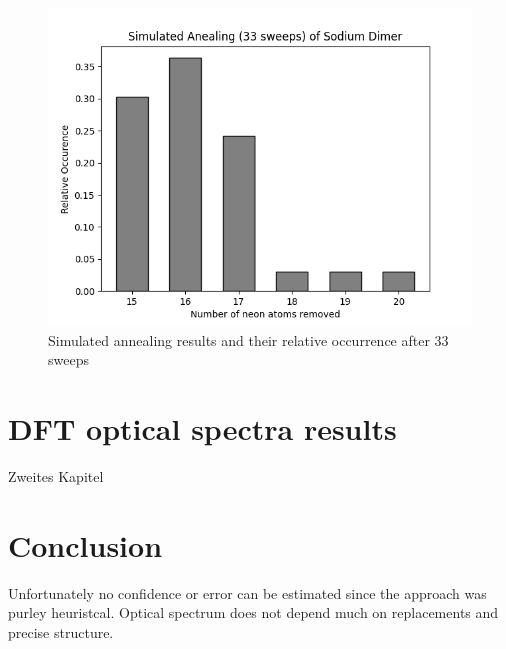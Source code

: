 \begin{figure}
	\centering
	\includegraphics[scale = 0.5]{Inhalt/Bilder/optimal_defect_simulated_annealing_dimer.png}
	\caption{Simulated annealing results and their relative occurrence after 33 sweeps}
	\label{fig:simulatedannealingsodiumdimer}
\end{figure}

\chapter{DFT optical spectra results}
\label{chap:Zweites Kapitel}
%
Zweites Kapitel
%
%
\chapter{Conclusion}
Unfortunately no confidence or error can be estimated since the approach was purley heuristcal. Optical spectrum does not depend much on replacements and precise structure.



